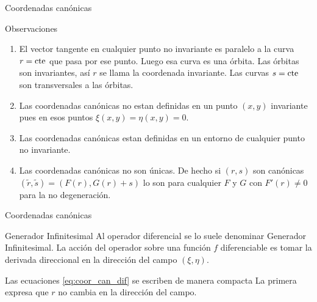 \documentclass[handout,hyperref={colorlinks=true}]{beamer}
\renewcommand{\emph}[1]{\textcolor[rgb]{1,0,0}{#1}}
\begin{document}
\begin{frame}{Coordenadas canónicas}

 \begin{block}{Observaciones}
\begin{enumerate}
\item<+->El vector tangente en cualquier punto no invariante es paralelo a la curva $r=\hbox{cte}$ que pasa por ese punto. Luego esa curva es una órbita. Las órbitas son invariantes, así  $r$ se llama la \emph{coordenada invariante}. Las curvas $s=\hbox{cte}$ son transversales a las órbitas.
\item<+-> Las coordenadas canónicas no estan definidas en un punto $(x,y)$ invariante pues en esos puntos $\xi(x,y)=\eta(x,y)=0$.

\item<+-> Las coordenadas canónicas estan definidas en un entorno de cualquier   punto no invariante.

\item<+-> Las coordenadas canónicas no son únicas. De hecho si $(r,s)$ son canónicas $(\tilde{r},\tilde{s})=(F(r),G(r)+s)$ lo son para cualquier $F$ y $G$ con $F'(r)\neq 0$ para la no degeneración.

\end{enumerate}
\end{block}



\end{frame}


\begin{frame}{Coordenadas canónicas}
 \begin{block}{Generador Infinitesimal}
Al operador diferencial
se lo suele denominar \emph{Generador Infinitesimal}. La acción del operador sobre una función $f$ diferenciable es tomar la derivada direccional en la dirección del campo $(\xi,\eta)$. 
\end{block}

Las ecuaciones \eqref{eq:coor_can_dif} se escriben de manera compacta
La primera expresa que $r$ no cambia en la dirección del campo.

\end{frame}
\end{document}
